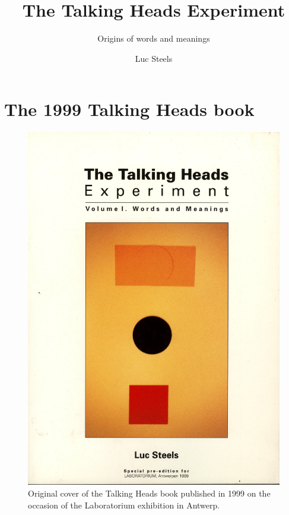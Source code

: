 \documentclass[ number=1
			   ,series=cmle
			   ,url=http://langsci-press.org/ 
			   ,isbn=978-3-944675-42-8
			   ,output=short   %
			   ,smallfont
			   ,biblatex
			   ,draftmode  
			  ]{LSP/langsci}
\title{The Talking Heads Experiment}
\subtitle{Origins of words and meanings}
\author{Luc Steels}
\begin{document}
 


\maketitle                
\frontmatter

\tableofcontents    

\mainmatter 

\part{The 1999 Talking Heads book} \label{part:1}

\begin{figure}[htbp]
  \centerline{\includegraphics[width=1.0\textwidth]{extra/figs/cover-original-book.pdf}}
\caption{\small\label{left-right} Original cover of the Talking Heads book published in 1999 on the occasion of the 
Laboratorium exhibition in Antwerp.}
\label{f:cover}
\end{figure}
\end{document}
